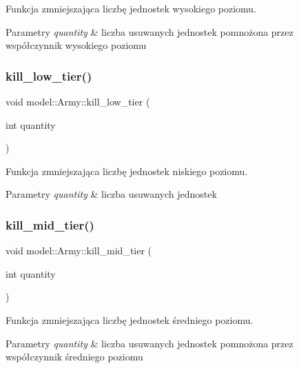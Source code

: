 Funkcja zmniejszająca liczbę jednostek wysokiego poziomu. 
\begin{DoxyParams}{Parametry}
{\em quantity} & liczba usuwanych jednostek pomnożona przez współczynnik wysokiego poziomu \\
\hline
\end{DoxyParams}
\mbox{\label{classmodel_1_1Army_ae9f218c741bba69fab5ba304a037411b}} 
\subsubsection{\texorpdfstring{kill\+\_\+low\+\_\+tier()}{kill\_low\_tier()}}
{\footnotesize\ttfamily void model\+::\+Army\+::kill\+\_\+low\+\_\+tier (\begin{DoxyParamCaption}\item[{int}]{quantity }\end{DoxyParamCaption})\hspace{0.3cm}{\ttfamily [inline]}}

Funkcja zmniejszająca liczbę jednostek niskiego poziomu. 
\begin{DoxyParams}{Parametry}
{\em quantity} & liczba usuwanych jednostek \\
\hline
\end{DoxyParams}
\mbox{\label{classmodel_1_1Army_a25e008794fb0295355658734000f9924}} 
\subsubsection{\texorpdfstring{kill\+\_\+mid\+\_\+tier()}{kill\_mid\_tier()}}
{\footnotesize\ttfamily void model\+::\+Army\+::kill\+\_\+mid\+\_\+tier (\begin{DoxyParamCaption}\item[{int}]{quantity }\end{DoxyParamCaption})\hspace{0.3cm}{\ttfamily [inline]}}

Funkcja zmniejszająca liczbę jednostek średniego poziomu. 
\begin{DoxyParams}{Parametry}
{\em quantity} & liczba usuwanych jednostek pomnożona przez współczynnik średniego poziomu \\
\hline
\end{DoxyParams}
\mbox{\label{classmodel_1_1Army_aad5caea451cef381210253fa32b70089}} 
